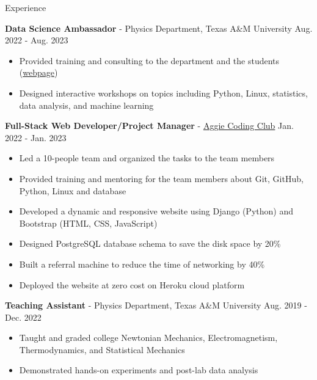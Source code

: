 \documentclass{resume}
\begin{document}
\begin{rSection}{Experience}
    \item \textbf{Data Science Ambassador} - Physics Department, Texas A\&M University \hfill Aug. 2022 - Aug. 2023
        \begin{itemize}
        \item Provided training and consulting to the department and the students (\href{https://noctildon.github.io/DS_ambassador/index.html}{webpage})
        \item Designed interactive workshops on topics including Python, Linux, statistics, data analysis, and machine learning
        \end{itemize}

    \item \textbf{Full-Stack Web Developer/Project Manager} - \href{https://aggiecodingclub.com}{Aggie Coding Club} \hfill Jan. 2022 - Jan. 2023
        \begin{itemize}
            \item Led a 10-people team and organized the tasks to the team members
            \item Provided training and mentoring for the team members about Git, GitHub, Python, Linux and database
            \item Developed a dynamic and responsive website using Django (Python) and Bootstrap (HTML, CSS, JavaScript)
            \item Designed PostgreSQL database schema to save the disk space by 20\%
            \item Built a referral machine to reduce the time of networking by 40\%
            \item Deployed the website at zero cost on Heroku cloud platform
        \end{itemize}

    \item \textbf{Teaching Assistant} - Physics Department, Texas A\&M University \hfill Aug. 2019 - Dec. 2022
        \begin{itemize}
        \item Taught and graded college Newtonian Mechanics, Electromagnetism, Thermodynamics, and Statistical Mechanics
        \item Demonstrated hands-on experiments and post-lab data analysis
        \end{itemize}
\end{rSection}
\end{document}
